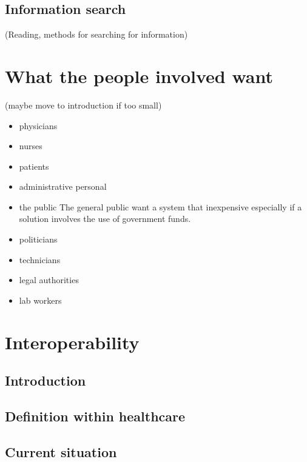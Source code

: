 \documentclass[14pt]{article}
\begin{document}
\subsection{Information search}
(Reading, methods for searching for information)

\newpage

\section{What the people involved want}
(maybe move to introduction if too small)
\begin{itemize}
\item physicians
\item nurses
\item patients
\item administrative personal
\item the public
The general public want a system that inexpensive especially if a solution involves the use of government funds.
\item politicians
\item technicians
\item legal authorities
\item lab workers
\end{itemize}

\newpage

\section{Interoperability}

\subsection{Introduction} %

\subsection{Definition within healthcare} %
\label{sec:interopDefinition}

\subsection{Current situation} %
\end{document}
